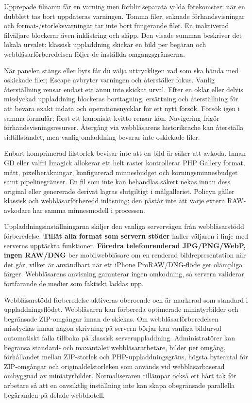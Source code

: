 \documentclass[11pt,a4paper]{article}
\newcommand{\ui}[1]{\textbf{#1}}
\begin{document}
Upprepade filnamn får en varning men förblir separata valda förekomster; när en
dubblett tas bort uppdateras varningen. Tomma filer, saknade förhandsvisningar
och format-/storleksvarningar tar inte bort fungerande filer. En inaktiverad
filväljare blockerar även inklistring och släpp. Den visade summan beskriver det
lokala urvalet: klassisk uppladdning skickar en bild per begäran och
webbläsarförberedelsen följer de inställda omgångsgränserna.

När panelen stängs eller byts får du välja uttryckligen vad som ska hända med
oskickade filer; Escape avbryter varningen och återställer fokus. Vanlig
återställning rensar endast ett ännu inte skickat urval. Efter en oklar eller
delvis misslyckad uppladdning blockeras borttagning, ersättning och
återställning för att bevara exakt indata och operationsnycklar för ett nytt
försök. Försök igen i samma formulär; först ett kanoniskt kvitto rensar kön.
Navigering frigör förhandsvisningsresurser. Återgång via webbläsarens
historikcache kan återställa sidtillståndet, men vanlig omladdning bevarar inte
oskickade filer.

Enbart komprimerad filstorlek bevisar inte att en bild är säker att avkoda.
Innan GD eller valfri Imagick allokerar ett helt raster kontrollerar PHP Gallery
format, mått, pixelberäkningar, konfigurerad minnesbudget och
körningsminnesbudget samt pipelinegränser. En fil som inte kan behandlas säkert
nekas innan dess original eller genererade derivat lagras slutgiltigt i
målgalleriet. Policyn gäller klassisk och webbläsarförberedd inläsning; den
påstår inte att varje extern RAW-avkodare har samma minnesmodell i processen.

Uppladdningsinställningarna skiljer den vanliga servervägen från webbläsarstödd
förberedelse. \ui{Tillåt alla format som servern stöder} håller väljaren i linje
med serverns upptäckta funktioner. \ui{Föredra telefonrenderad JPG/PNG/WebP,
ingen RAW/DNG} ber mobilwebbläsare om en renderad bildrepresentation när det
går, vilket är användbart när ett iPhone ProRAW/DNG-flöde ger olämpliga färger.
Webbläsarens anvisning garanterar ingen omkodning, så servern validerar
fortfarande de medier som faktiskt laddas upp.

Webbläsarstödd förberedelse aktiveras oberoende och är markerad som standard i
uppladdningsflödet. Webbläsaren kan förbereda optimerade miniatyrbilder och
begränsade ZIP-omgångar innan de skickas. Om webbläsarförberedelsen misslyckas
innan någon skrivning på servern börjar kan vanliga bildurval automatiskt falla
tillbaka på klassisk serveruppladdning. Administratörer kan begränsa standard-
och maxantalet webbläsararbetare, bilder per omgång, förhållandet mellan
ZIP-storlek och PHP-uppladdningsgräns, högsta byteantal för ZIP-omgångar och
originaldelstorleken som används vid webbläsarbaserad ombyggnad av
miniatyrbilder. Normaliseraren tillämpar också ett hårt tak för arbetare så att
en oavsiktlig inställning inte kan skapa obegränsade parallella begäranden på
delade webbhotell.
\end{document}
